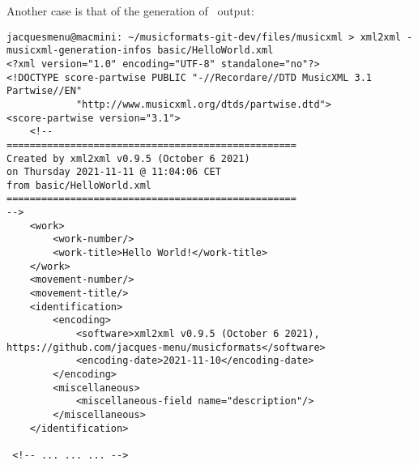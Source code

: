 Another case is that of the generation of \mxml\ output:
\begin{lstlisting}[language=Terminal]
jacquesmenu@macmini: ~/musicformats-git-dev/files/musicxml > xml2xml -musicxml-generation-infos basic/HelloWorld.xml
<?xml version="1.0" encoding="UTF-8" standalone="no"?>
<!DOCTYPE score-partwise PUBLIC "-//Recordare//DTD MusicXML 3.1 Partwise//EN"
			"http://www.musicxml.org/dtds/partwise.dtd">
<score-partwise version="3.1">
    <!--
==================================================
Created by xml2xml v0.9.5 (October 6 2021)
on Thursday 2021-11-11 @ 11:04:06 CET
from basic/HelloWorld.xml
==================================================
-->
    <work>
        <work-number/>
        <work-title>Hello World!</work-title>
    </work>
    <movement-number/>
    <movement-title/>
    <identification>
        <encoding>
            <software>xml2xml v0.9.5 (October 6 2021), https://github.com/jacques-menu/musicformats</software>
            <encoding-date>2021-11-10</encoding-date>
        </encoding>
        <miscellaneous>
            <miscellaneous-field name="description"/>
        </miscellaneous>
    </identification>

 <!-- ... ... ... -->
\end{lstlisting}

